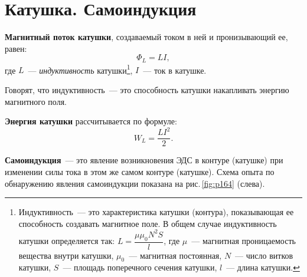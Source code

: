 \documentclass[main.tex]{subfiles}
\begin{document}

 

 

 
   

\section{Катушка. Самоиндукция}



\textbf{Магнитный поток катушки}, создаваемый током в ней и пронизывающий ее, равен:
\begin{equation}
    \Phi_L=LI,
\end{equation}
где $L$~--- \emph{индуктивность} катушки\footnote{Индуктивность~--- это характеристика катушки (контура), показывающая ее способность создавать магнитное поле. В общем случае индуктивность катушки определяется так: $L=\dfrac{\mu\mu_0N^2S}{l}$, где $\mu$~--- магнитная проницаемость вещества внутри катушки, $\mu_0$~--- магнитная постоянная, $N$~--- число витков катушки, $S$~--- площадь поперечного сечения катушки, $l$~--- длина катушки.}, $I$~--- ток в катушке.



Говорят, что индуктивность~--- это способность катушки накапливать энергию магнитного поля.

\textbf{Энергия катушки} рассчитывается по формуле:
\begin{equation}
    W_L=\frac{LI^2}{2}.
\end{equation}

\textbf{Самоиндукция}~--- это явление возникновения ЭДС в контуре (катушке) при изменении силы тока в этом же самом контуре (катушке). Схема опыта по обнаружению явления самоиндукции показана на рис.\,\ref{fig:p164} (слева).
\end{document}
